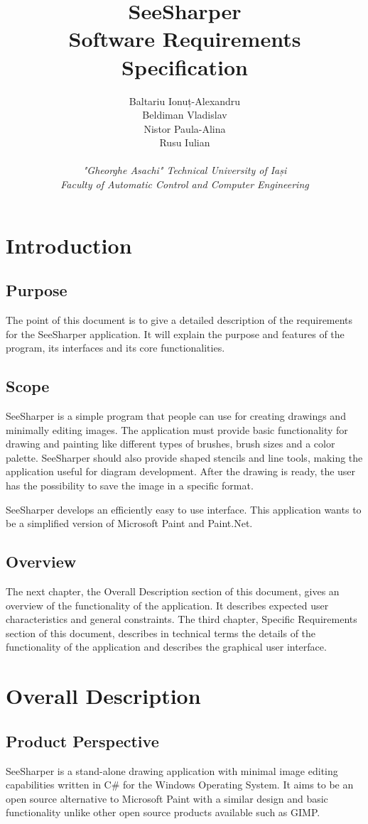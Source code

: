 \documentclass[12pt]{article}
\title
{
	\textbf
	{
		SeeSharper
		\\
		Software Requirements Specification
	}
}
\author
{
	Baltariu Ionuț-Alexandru
	\\
	Beldiman Vladislav
	\\
	Nistor Paula-Alina 
	\\
	Rusu Iulian
	\\
	\\
	\textit{"Gheorghe Asachi" Technical University of Iași}
	\\
	\textit{Faculty of Automatic Control and Computer Engineering}
}
\date{}
\begin{document}
\maketitle 

\newpage
\tableofcontents
\newpage

\section{Introduction}
\subsection{Purpose}
The point of this document is to give a detailed description of the requirements for the SeeSharper application.
It will explain the purpose and features of the program, its interfaces and its core functionalities.

\subsection{Scope}
SeeSharper is a simple program that people can use for creating drawings and minimally editing images. The application must provide basic functionality for drawing and painting like different types of brushes, brush sizes and a color palette. 
SeeSharper should also provide shaped stencils and line tools, making the application useful for diagram development. After the drawing is ready, the user has the possibility to save the image in a specific format.

SeeSharper develops an efficiently easy to use interface. This application wants to be a simplified version of Microsoft Paint and Paint.Net.

\subsection{Overview}
The next chapter, the Overall Description section of this document, gives an overview of the functionality of the application. It describes expected user characteristics and general constraints. The third chapter, Specific Requirements section of this document, describes in technical terms the details of the functionality of the application and describes the graphical  user  interface.	

\section{Overall Description}
\subsection{Product Perspective}
SeeSharper is a stand-alone drawing application with minimal image editing capabilities written in C\# for the Windows Operating System. It aims to be an open source alternative to Microsoft Paint with a similar design and basic functionality unlike other open source products available such as GIMP.
\end{document}
